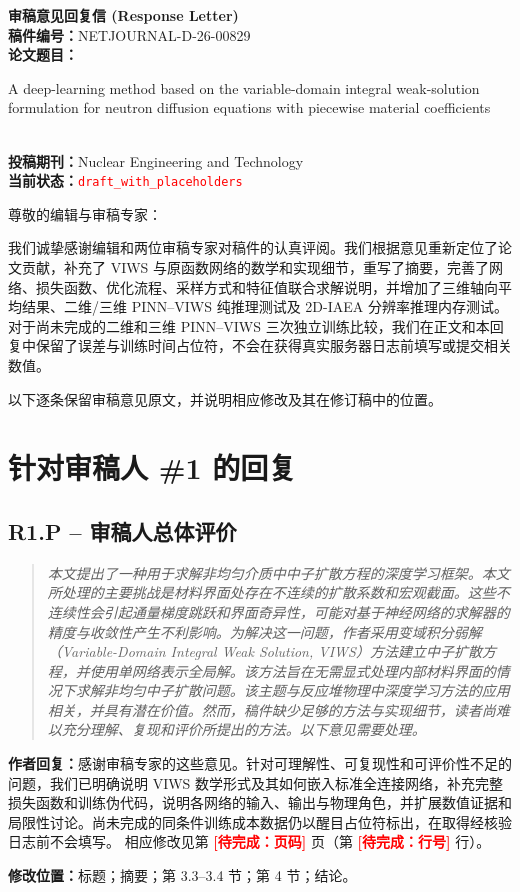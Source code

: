 \documentclass[11pt,a4paper]{article}
\newenvironment{reviewercomment}{\begin{quote}\small\itshape\color{commentgray}}{\end{quote}}
\newcommand{\authorresponse}{\noindent\textbf{作者回复：}\quad}
\newcommand{\revisionlocation}[1]{\par\noindent\textcolor{locationblue}{\textbf{修改位置：}}#1}
\newcommand{\draftplaceholder}[1]{\textcolor{red}{\textbf{[待完成：#1]}}}
\begin{document}
\begin{center}
{\LARGE\textbf{审稿意见回复信 (Response Letter)}}\\[1em]
\textbf{稿件编号：}NETJOURNAL-D-26-00829\\
\textbf{论文题目：}\parbox[t]{0.82\textwidth}{\centering A deep-learning method based on the variable-domain integral weak-solution formulation for neutron diffusion equations with piecewise material coefficients}\\[0.5em]
\textbf{投稿期刊：}Nuclear Engineering and Technology\\[0.5em]
\textbf{当前状态：}\textcolor{red}{\texttt{draft\_with\_placeholders}}
\end{center}

\vspace{1em}
尊敬的编辑与审稿专家：

我们诚挚感谢编辑和两位审稿专家对稿件的认真评阅。我们根据意见重新定位了论文贡献，补充了 VIWS 与原函数网络的数学和实现细节，重写了摘要，完善了网络、损失函数、优化流程、采样方式和特征值联合求解说明，并增加了三维轴向平均结果、二维/三维 PINN--VIWS 纯推理测试及 2D-IAEA 分辨率推理内存测试。对于尚未完成的二维和三维 PINN--VIWS 三次独立训练比较，我们在正文和本回复中保留了误差与训练时间占位符，不会在获得真实服务器日志前填写或提交相关数值。

以下逐条保留审稿意见原文，并说明相应修改及其在修订稿中的位置。

\section*{针对审稿人 \#1 的回复}

\subsection*{R1.P -- 审稿人总体评价}
\begin{reviewercomment}
本文提出了一种用于求解非均匀介质中中子扩散方程的深度学习框架。本文所处理的主要挑战是材料界面处存在不连续的扩散系数和宏观截面。这些不连续性会引起通量梯度跳跃和界面奇异性，可能对基于神经网络的求解器的精度与收敛性产生不利影响。为解决这一问题，作者采用变域积分弱解（Variable-Domain Integral Weak Solution, VIWS）方法建立中子扩散方程，并使用单网络表示全局解。该方法旨在无需显式处理内部材料界面的情况下求解非均匀中子扩散问题。该主题与反应堆物理中深度学习方法的应用相关，并具有潜在价值。然而，稿件缺少足够的方法与实现细节，读者尚难以充分理解、复现和评价所提出的方法。以下意见需要处理。
\end{reviewercomment}
\authorresponse 感谢审稿专家的这些意见。针对可理解性、可复现性和可评价性不足的问题，我们已明确说明 VIWS 数学形式及其如何嵌入标准全连接网络，补充完整损失函数和训练伪代码，说明各网络的输入、输出与物理角色，并扩展数值证据和局限性讨论。尚未完成的同条件训练成本数据仍以醒目占位符标出，在取得经核验日志前不会填写。
相应修改见第 \draftplaceholder{页码} 页（第 \draftplaceholder{行号} 行）。
\revisionlocation{标题；摘要；第 3.3--3.4 节；第 4 节；结论。}
\end{document}
